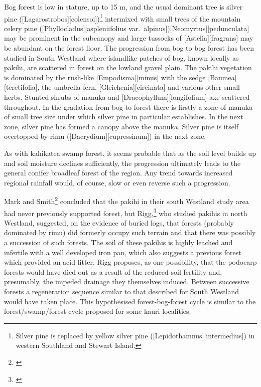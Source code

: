 Bog forest is low in stature, up to 15 m, and the usual dominant tree is silver pine ([Lagarostrobos][colensoi])\footnote{Silver pine is replaced by yellow silver pine ([Lepidothamnus][intermedius]) in western Southland and Stewart Island.} intermixed with small trees of the mountain celery pine ([Phyllocladus][aspleniifolius var.\ alpinus])[Neomyrtus][pedunculata] may be prominent in the subcanopy and large tussocks of [Astelia][fragrans] may be abundant on the forest floor.
The progression from bog to bog forest has been studied in South Westland where islandlike patches of bog, known locally as pakihi, are scattered in forest on the lowland gravel plain.
The pakihi vegetation is dominated by the rush-like [Empodisma][minus] with the sedge [Baumea][teretifolia], the umbrella fern, [Gleichenia][circinata] and various other small herbs.
Stunted shrubs of manuka and [Dracophyllum][longifolium] axe scattered throughout.
In the gradation from bog to forest there is firstly a zone of manuka of small tree size under which silver pine in particular establishes.
In the next zone, silver pine has formed a canopy above the manuka.
Silver pine is itself overtopped by rimu ([Dacrydium][cupressinum]) in the next zone.

As with kahikatea swamp forest, it seems probable that as the soil level builds up and soil moisture declines sufficiently, the progression ultimately leads to the general conifer broadleaf forest of the region.
Any trend towards increased regional rainfall would, of course, slow or even reverse such a progression.

Mark and Smith\footnote{\cite{mark1975lowland}} concluded that the pakihi in their south Westland study area had never previously supported forest, but Rigg,\footnote{\cite{rigg1962pakihi}} who studied pakihis in north Westland, suggested, on the evidence of buried logs, that forests (probably dominated by rimu) did formerly occupy such terrain and that there was possibly a succession of such forests.
The soil of these pakihis is highly leached and infertile with a well developed iron pan, which also suggests a previous forest which provided an acid litter.
Rigg proposes, as one possibility, that the podocarp forests would have died out as a result of the reduced soil fertility and, presumably, the impeded drainage they themselves induced.
Between successive forests a regeneration sequence similar to that described for South Westland would have taken place.
This hypothesised forest-bog-forest cycle is similar to the forest/swamp/forest cycle proposed for some kauri localities.

